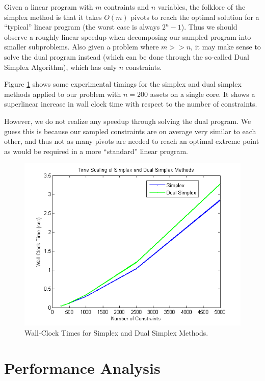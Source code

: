 \documentclass[12pt]{article}
\begin{document}
Given a linear program with $m$ contraints and $n$ variables, the folklore of the simplex method is that it takes $O(m)$ pivots to reach the optimal solution for a ``typical'' linear program (the worst case is always $2^n - 1$).
Thus we should observe a roughly linear speedup when decomposing our sampled program into smaller subproblems.
Also given a problem where $m >> n$, it may make sense to solve the dual program instead (which can be done through the so-called Dual Simplex Algorithm), which has only $n$ constraints.

Figure \ref{fig:fig_simplex_time} shows some experimental timings for the simplex and dual simplex methods applied to our problem with $n = 200$ assets on a single core.
It shows a superlinear increase in wall clock time with respect to the number of constraints.

However, we do not realize any speedup through solving the dual program.  
We guess this is because our sampled constraints are on average very similar to each other, and thus not as many pivots are needed to reach an optimal extreme point as would be required in a more ``standard'' linear program.

\begin{figure}[ht]
	\centering
		\includegraphics[scale=0.9]{../plot/figs/fig_simplex_time.png}
	\caption{Wall-Clock Times for Simplex and Dual Simplex Methods.}
	\label{fig:fig_simplex_time}
\end{figure}

\section*{Performance Analysis}
\end{document}
